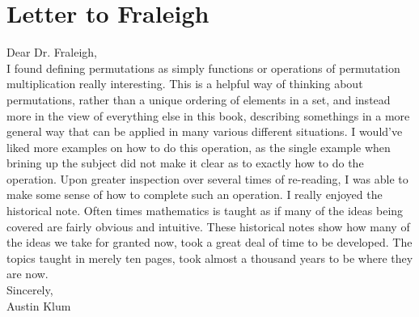 \documentclass[11pt]{article}
\theoremstyle{plain}
\theoremstyle{definition}
\begin{document}
\section{Letter to Fraleigh}
Dear Dr. Fraleigh,\\
I found defining permutations as simply functions or operations of permutation multiplication really interesting. This is a helpful way of thinking about permutations, rather than a unique ordering of elements in a set, and instead more in the view of everything else in this book, describing somethings in a more general way that can be applied in many various different situations. I would've liked more examples on how to do this operation, as the single example when brining up the subject did not make it clear as to exactly how to do the operation. Upon greater inspection over several times of re-reading, I was able to make some sense of how to complete such an operation. I really enjoyed the historical note. Often times mathematics is taught as if many of the ideas being covered are fairly obvious and intuitive. These historical notes show how many of the ideas we take for granted now, took a great deal of time to be developed. The topics taught in merely ten pages, took almost a thousand years to be where they are now.
\\
Sincerely,\\
Austin Klum
\end{document}
